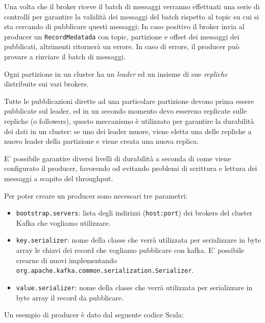 \documentclass[]{article}
\providecommand{\tightlist}{%
  \setlength{\itemsep}{0pt}\setlength{\parskip}{0pt}}
\begin{document}
Una volta che il broker riceve il batch di messaggi verranno effettuati
una serie di controlli per garantire la validità dei messaggi del batch
rispetto al topic su cui si sta cercando di pubblicare questi messaggi;
In caso positivo il broker invia al producer un \texttt{RecordMedatada}
con topic, partizione e offset dei messaggi dei pubblicati, altrimenti
ritornerà un errore. In caso di errore, il producer può provare a
rinviare il batch di messaggi.

Ogni partizione in un cluster ha un \emph{leader} ed un insieme di sue
\emph{repliche} distribuite sui vari brokers.

Tutte le pubblicazioni dirette ad una particolare partizione devono
prima essere pubblicate sul leader, ed in un secondo momento devo
essereno replicate sulle repliche (o followers), questo meccanismo è
utilizzato per garantire la durabilità dei dati in un cluster: se uno
dei leader muore, viene eletta una delle repliche a nuovo leader della
partizione e viene creata una nuova replica.

E' possibile garantire diversi livelli di durabilità a seconda di come
viene configurato il producer, favorendo od evitando problemi di
scrittura e lettura dei messaggi a scapito del throughput.

\newpage

Per poter creare un producer sono necessari tre parametri:

\begin{itemize}
\tightlist
\item
  \texttt{bootstrap.servers}: lista degli indirizzi (\texttt{host:port})
  dei brokers del cluster Kafka che vogliamo utilizzare.
\item
  \texttt{key.serializer}: nome della classe che verrà utilizzata per
  serializzare in byte array le chiavi dei record che vogliamo
  pubblicare con kafka. E' possibile crearne di nuovi implementando
  \texttt{org.apache.kafka.common.serialization.Serializer}.
\item
  \texttt{value.serializer}: nome della classe che verrà utilizzata per
  serializzare in byte array il record da pubblicare.
\end{itemize}

Un esempio di producer è dato dal seguente codice Scala:

\small  
\end{document}
